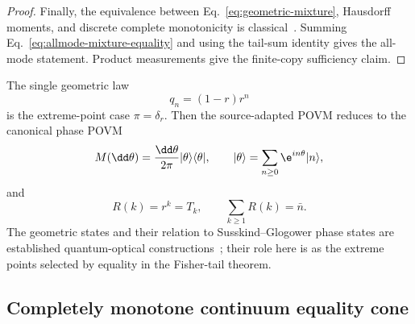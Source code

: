 \begin{proof}
Finally, the equivalence between Eq.~\eqref{eq:geometric-mixture}, Hausdorff moments, and discrete complete monotonicity is classical~\cite{BalabdaouiFournas2020}.  Summing Eq.~\eqref{eq:allmode-mixture-equality} and using the tail-sum identity gives the all-mode statement.  Product measurements give the finite-copy sufficiency claim.
\end{proof}

The single geometric law
\begin{equation}
 q_n=(1-r)r^n
 \label{eq:geometric}
\end{equation}
is the extreme-point case $\pi=\delta_r$.  Then the source-adapted POVM reduces to the canonical phase POVM
\begin{equation}
 M(\dd\theta)=\frac{\dd\theta}{2\pi}|\theta\rangle\langle\theta|,
 \qquad |\theta\rangle=\sum_{n\geq0}\e^{in\theta}|n\rangle,
 \label{eq:canonical-phase}
\end{equation}
and
\begin{equation}
 R(k)=r^k=T_k,
 \qquad
 \sum_{k\geq1}R(k)=\bar n.
 \label{eq:discrete-equality}
\end{equation}
The geometric states and their relation to Susskind--Glogower phase states are established quantum-optical constructions~\cite{FuSasaki1997}; their role here is as the extreme points selected by equality in the Fisher-tail theorem.

\subsection{Completely monotone continuum equality cone}

